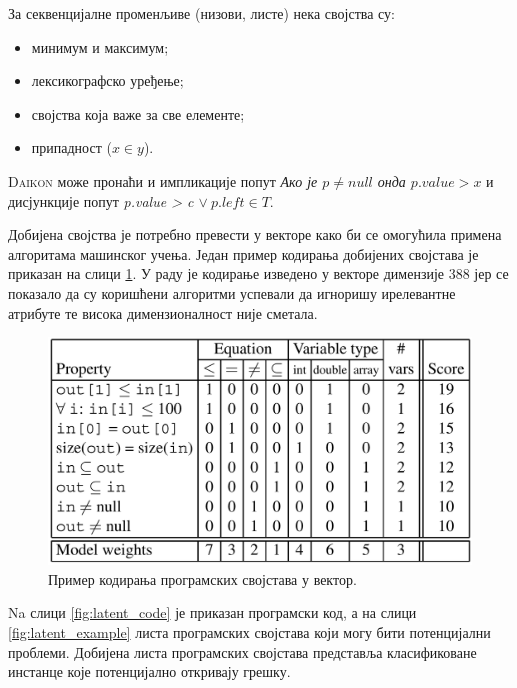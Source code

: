 \documentclass[a4paper]{article}
\begin{document}
{За секвенцијалне променљиве (низови, листе) нека својства су:
\begin{itemize}
    \item минимум и максимум;
    \item лексикографско уређење;
    \item својства која важе за све елементе;
    \item припадност ($x \in y$).
\end{itemize}

\textsc{Daikon} може пронаћи и импликације попут \textit{Ако је $p \neq null$ онда $p.value > x$}
и дисјункције попут \textit{p.value > c $\lor \ p.left \in T$}.

Добијена својства је потребно превести у векторе како би се омогућила примена алгоритама машинског учења.
Један пример кодирања добијених својстава је приказан на слици \ref{fig:latent_coding}.
У раду је кодирање изведено у векторе димензије 388 јер се показало да су коришћени алгоритми
успевали да игноришу ирелевантне атрибуте те висока димензионалност није сметала.

\begin{figure}[h!]
\begin{center}
\includegraphics[scale=0.18]{./slike/latent_errors_table.png}
\end{center}
    \caption{Пример кодирања програмских својстава у вектор.}
\label{fig:latent_coding}
\end{figure}

Na слици \ref{fig:latent_code} је приказан програмски код, а на слици \ref{fig:latent_example}
листа програмских својстава који могу бити потенцијални проблеми. Добијена листа програмских својстава
представља класификоване инстанце које потенцијално откривају грешку.

}
\end{document}
